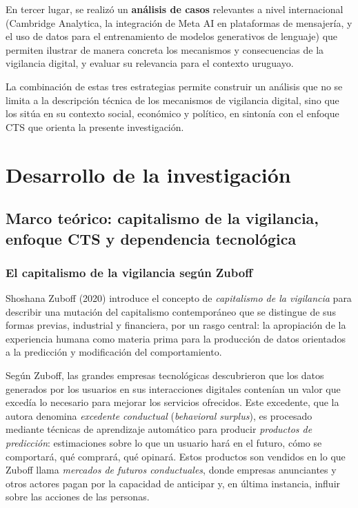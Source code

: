 \documentclass[11pt,a4paper]{article}
\begin{document}
En tercer lugar, se realizó un \textbf{análisis de casos} relevantes a nivel internacional (Cambridge Analytica, la integración de Meta AI en plataformas de mensajería, y el uso de datos para el entrenamiento de modelos generativos de lenguaje) que permiten ilustrar de manera concreta los mecanismos y consecuencias de la vigilancia digital, y evaluar su relevancia para el contexto uruguayo.

La combinación de estas tres estrategias permite construir un análisis que no se limita a la descripción técnica de los mecanismos de vigilancia digital, sino que los sitúa en su contexto social, económico y político, en sintonía con el enfoque CTS que orienta la presente investigación.

\section{Desarrollo de la investigación}

\subsection{Marco teórico: capitalismo de la vigilancia, enfoque CTS y dependencia tecnológica}

\subsubsection{El capitalismo de la vigilancia según Zuboff}

Shoshana Zuboff (2020) introduce el concepto de \textit{capitalismo de la vigilancia} para describir una mutación del capitalismo contemporáneo que se distingue de sus formas previas, industrial y financiera, por un rasgo central: la apropiación de la experiencia humana como materia prima para la producción de datos orientados a la predicción y modificación del comportamiento.

Según Zuboff, las grandes empresas tecnológicas descubrieron que los datos generados por los usuarios en sus interacciones digitales contenían un valor que excedía lo necesario para mejorar los servicios ofrecidos. Este excedente, que la autora denomina \textit{excedente conductual} (\textit{behavioral surplus}), es procesado mediante técnicas de aprendizaje automático para producir \textit{productos de predicción}: estimaciones sobre lo que un usuario hará en el futuro, cómo se comportará, qué comprará, qué opinará. Estos productos son vendidos en lo que Zuboff llama \textit{mercados de futuros conductuales}, donde empresas anunciantes y otros actores pagan por la capacidad de anticipar y, en última instancia, influir sobre las acciones de las personas.
\end{document}
